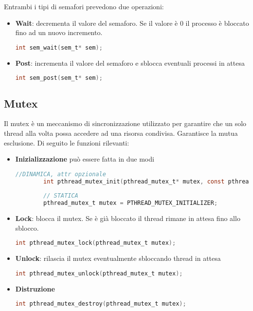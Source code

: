 \newpage
Entrambi i tipi di semafori prevedono due operazioni:
\begin{itemize}
	\item \textbf{Wait}: decrementa il valore del semaforo. Se il valore è $0$ il processo è bloccato fino ad un nuovo incremento.
	\begin{lstlisting}[language=C]
		int sem_wait(sem_t* sem);
	\end{lstlisting}
	\item \textbf{Post}: incrementa il valore del semaforo e sblocca eventuali processi in attesa
	\begin{lstlisting}[language=C]
		int sem_post(sem_t* sem);
	\end{lstlisting}
\end{itemize}

\subsection{Mutex}
Il mutex è un meccanismo di sincronizzazione utilizzato per garantire che un solo thread alla volta possa accedere ad una risorsa condivisa. Garantisce la mutua esclusione. Di seguito le funzioni rilevanti:
\begin{itemize}
	\item \textbf{Inizializzazione} può essere fatta in due modi
	\begin{lstlisting}[language=C]
		//DINAMICA, attr opzionale
		int pthread_mutex_init(pthread_mutex_t* mutex, const pthread_mutex_attr_t* attr);
		
		// STATICA
		pthread_mutex_t mutex = PTHREAD_MUTEX_INITIALIZER;
	\end{lstlisting}
	\item \textbf{Lock}: blocca il mutex. Se è già bloccato il thread rimane in attesa fino allo sblocco.
	\begin{lstlisting}[language=C]
		int pthread_mutex_lock(pthread_mutex_t mutex);
	\end{lstlisting}
	\item \textbf{Unlock}: rilascia il mutex eventualmente sbloccando thread in attesa
	\begin{lstlisting}[language=C]
	int pthread_mutex_unlock(pthread_mutex_t mutex);
	\end{lstlisting}
	\item \textbf{Distruzione}
	\begin{lstlisting}[language=C]
		int pthread_mutex_destroy(pthread_mutex_t mutex);
	\end{lstlisting}
\end{itemize}

